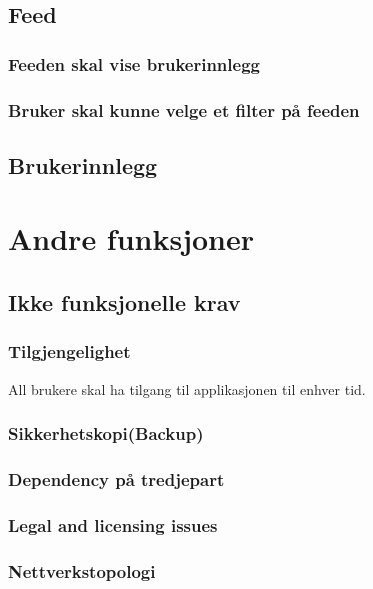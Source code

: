 \documentclass[12pt]{article}
\begin{document}
    \subsection{Feed}

    \subsubsection{Feeden skal vise brukerinnlegg}

    \subsubsection{Bruker skal kunne velge et filter på feeden}

    \subsection{Brukerinnlegg}

           
\section{Andre funksjoner}
    \subsection{Ikke funksjonelle krav}

        \subsubsection{Tilgjengelighet}
        All brukere skal ha tilgang til applikasjonen til enhver tid.
        
        \subsubsection{Sikkerhetskopi(Backup)}


        \subsubsection{Dependency på tredjepart}


        \subsubsection{Legal and licensing issues}


        \subsubsection{Nettverkstopologi}
\end{document}
